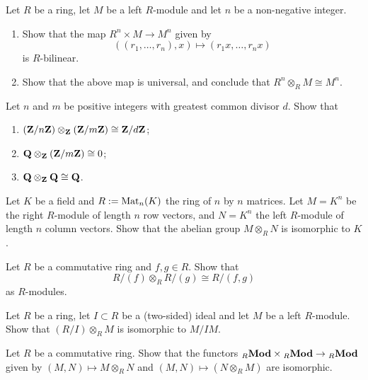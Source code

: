 \begin{exercise}Let $R$ be a ring, let $M$ be a left $R$-module and let $n$ be a non-negative integer.  
\begin{enumerate}
\item Show that the map $R^n \times M \to M^n$ given by 
\[((r_1,\ldots,r_n),x) \mapsto (r_1x,\ldots, r_nx)\]
is $R$-bilinear.
\item Show that the above map is universal, and conclude that $R^n \otimes_R M \cong M^n$.
\end{enumerate}
\end{exercise}
%
%
%
\begin{exercise} \label{exc:tensor-Z-mod-nZ}
Let $n$ and $m$ be positive integers with greatest common divisor $d$. Show that 
\begin{enumerate}
\item $({\mathbf{Z}}/n{\mathbf{Z}}) \otimes_{\mathbf{Z}} ({\mathbf{Z}}/m{\mathbf{Z}}) \cong {\mathbf{Z}}/d{\mathbf{Z}}$;
\item ${\mathbf{Q}}\otimes_{\mathbf{Z}} ({\mathbf{Z}}/m{\mathbf{Z}}) \cong 0$;
\item ${\mathbf{Q}} \otimes_{\mathbf{Z}} {\mathbf{Q}} \cong {\mathbf{Q}}$.
\end{enumerate}
\end{exercise}

\begin{exercise}
Let $K$ be a field and $R:=\operatorname{Mat}_n(K)$ the ring of $n$ by $n$ matrices. Let $M=K^n$ be the right $R$-module of length $n$ row vectors, and $N=K^n$ the left $R$-module of length $n$ column vectors. Show that the abelian group $M\otimes_R N$ is isomorphic to $K$.
\end{exercise}


\begin{exercise}
Let $R$ be a commutative ring and $f,g\in R$. Show that
\[
	R/(f) \otimes_R R/(g) \cong R/(f,g)
\]
as $R$-modules.
\end{exercise}

\begin{exercise}
Let $R$ be a ring, let $I\subset R$ be a (two-sided) ideal and let $M$ be a left $R$-module. Show that 
$(R/I) \otimes_R M$ is isomorphic to $M/IM$.
\end{exercise}
\begin{exercise}
Let $R$ be a commutative ring. Show that the functors ${}_R\mathbf{Mod} \times {}_R\mathbf{Mod} \to {}_R\mathbf{Mod}$ given by $(M,N) \mapsto M\otimes_R N$ and $(M,N) \mapsto (N\otimes_R M)$ are isomorphic. 
\end{exercise}



